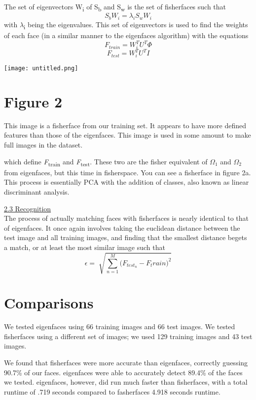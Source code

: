 \documentclass{tufte-handout}
\begin{document}
The set of eigenvectors W\textsubscript{i} of S\textsubscript{b} and S\textsubscript{w} is the set of fisherfaces such that \[S_bW_i = \lambda_iS_wW_i\] with $\lambda$\textsubscript{i} being the eigenvalues. This set of eigenvectors is used to find the weights of each face (in a similar manner to the eigenfaces algorithm) with the equations \[F_{train} = W_i^TU^T\Phi\] \[F_{test} = W_i^TU^TI\]

\begin{marginfigure}
\texttt{[image: untitled.png]}
\section{Figure 2}
This image is a fisherface from our training set. It appears to have more defined features than those of the eigenfaces. This image is used in some amount to make full images in the dataset.

\end{marginfigure}
which define \textit{F}\textsubscript{train} and \textit{F}\textsubscript{test}. These two are the fisher equivalent of \(\Omega_1\) and \(\Omega_2\) from eigenfaces, but this time in fisherspace. You can see a fisherface in figure 2a. This process is essentially PCA with the addition of classes, also known as linear discriminant analysis.

\vspace{5mm} \noindent \underline{2.3 Recognition}\\
The process of actually matching faces with fisherfaces is nearly identical to that of eigenfaces. It once again involves taking the euclidean distance between the test image and all training images, and finding that the smallest distance begets a match, or at least the most similar image such that \[\epsilon = \sqrt[]{\sum_{n=1}^{M} \big(F_{test_n} - F_train \big) ^2}\]

\section{Comparisons}
We tested eigenfaces using 66 training images and 66 test images. We tested fisherfaces using a different set of images; we used 129 training images and 43 test images.

We found that fisherfaces were more accurate than eigenfaces, correctly guessing 90.7\% of our faces. eigenfaces were able to accurately detect 89.4\% of the faces we tested. eigenfaces, however, did run much faster than fisherfaces, with a total runtime of .719 seconds compared to fasherfaces\textsc{} 4.918 seconds runtime.
\end{document}
